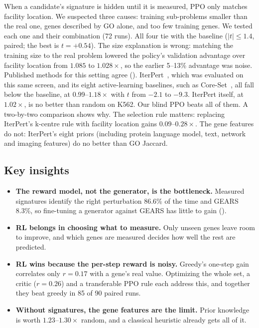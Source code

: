 \documentclass[11pt, letterpaper]{cmu}
\let\Cref\crtCref
\begin{document}
When a candidate's signature is hidden until it is measured, PPO only matches facility location.
We suspected three causes: training sub-problems smaller than the real one, genes described by
GO alone, and too few training genes. We tested each one and their combination (72 runs). All
four tie with the baseline ($|t|\le1.4$, paired; the best is $t=+0.54$). The size explanation is
wrong: matching the training size to the real problem lowered the policy's validation advantage
over facility location from $1.085$ to $1.028\times$, so the earlier 5--13\% advantage was noise.
Published methods for this setting agree (\Cref{fig:related}). IterPert~\citep{huang2024iterpert},
which was evaluated on this same screen, and its eight active-learning baselines, such as
Core-Set~\citep{sener2018coreset}, all fall below the baseline, at 0.99--$1.18\times$ with $t$ from $-2.1$ to $-9.3$. IterPert
itself, at $1.02\times$, is no better than random on K562. Our blind PPO beats all of them. A
two-by-two comparison shows why. The selection rule matters: replacing IterPert's k-centre rule
with facility location gains $0.09$--$0.28\times$. The gene features do not: IterPert's eight
priors (including protein language model, text, network and imaging features) do no better than
GO Jaccard.

\subsection{Key insights}
\label{sec:insights}

\begin{analysisbox}
\begin{itemize}[leftmargin=1.2em,itemsep=2pt,topsep=0pt]
\item \textbf{The reward model, not the generator, is the bottleneck.} Measured signatures identify
the right perturbation 86.6\% of the time and GEARS 8.3\%, so fine-tuning a generator against
GEARS has little to gain (\Cref{sec:oracle}).
\item \textbf{RL belongs in choosing what to measure.} Only unseen genes leave room to improve, and
which genes are measured decides how well the rest are predicted.
\item \textbf{RL wins because the per-step reward is noisy.} Greedy's one-step gain correlates only
$r{=}0.17$ with a gene's real value. Optimizing the whole set, a critic ($r{=}0.26$) and a
transferable PPO rule each address this, and together they beat greedy in 85 of 90 paired runs.
\item \textbf{Without signatures, the gene features are the limit.} Prior knowledge is worth
$1.23$--$1.30\times$ random, and a classical heuristic already gets all of it.
\end{itemize}
\end{analysisbox}
\end{document}
